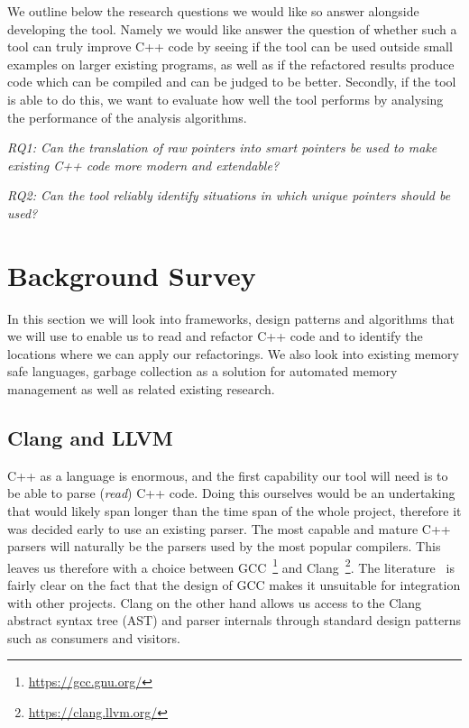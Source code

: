 \documentclass{proposal}
\begin{document}
    We outline below the research questions we would like so answer alongside developing the tool.
    Namely we would like answer the question of whether such a tool can truly improve C++ code by seeing if the tool can be used outside small examples on larger existing programs, as well as if the refactored results produce code which can be compiled and can be judged to be better.
    Secondly, if the tool is able to do this, we want to evaluate how well the tool performs by analysing the performance of the analysis algorithms.

    \emph{RQ1: Can the translation of raw pointers into smart pointers be used to make existing C++ code more modern and extendable?}

    \emph{RQ2: Can the tool reliably identify situations in which unique pointers should be used?}




    \section{Background Survey}\label{sec:background-survey}

    In this section we will look into frameworks, design patterns and algorithms that we will use to enable us to read and refactor C++ code and to identify the locations where we can apply our refactorings.
    We also look into existing memory safe languages, garbage collection as a solution for automated memory management as well as related existing research.

    \subsection{Clang and LLVM}\label{subsec:clang-and-llvm}

    C++ as a language is enormous, and the first capability our tool will need is to be able to parse (\textit{read}) C++ code.
    Doing this ourselves would be an undertaking that would likely span longer than the time span of the whole project, therefore it was decided early to use an existing parser.
    The most capable and mature C++ parsers will naturally be the parsers used by the most popular compilers.
    This leaves us therefore with a choice between GCC~\footnote{\url{https://gcc.gnu.org/}} and Clang~\footnote{\url{https://clang.llvm.org/}}.
    The literature~\cite{Duffy2014} is fairly clear on the fact that the design of GCC makes it unsuitable for integration with other projects.
    Clang on the other hand allows us access to the Clang abstract syntax tree (AST) and parser internals through standard design patterns such as consumers and visitors.
\end{document}
